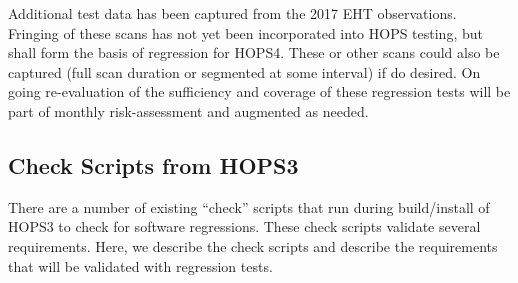 Additional test data has been captured from the 2017 \ac{EHT} observations.  Fringing of these scans has not yet been incorporated into HOPS testing, but shall form the basis of regression for HOPS4. These or other scans could also be captured (full scan duration or segmented at some interval) if do desired. On going re-evaluation of the sufficiency and coverage of these regression tests will be part of monthly risk-assessment and augmented as needed.

\subsection{Check Scripts from HOPS3}
\label{sec:regresscheck}


There are a number of existing ``check'' scripts that run during build/install of HOPS3 to check for software regressions. These check scripts validate several requirements. Here, we describe the check scripts and describe the requirements that will be validated with regression tests.


